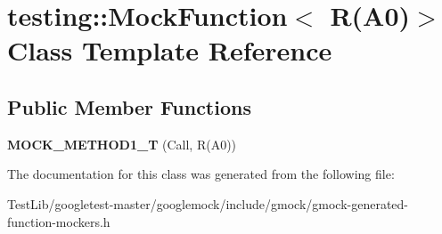 \hypertarget{classtesting_1_1MockFunction_3_01R_07A0_08_4}{}\section{testing\+:\+:Mock\+Function$<$ R(A0)$>$ Class Template Reference}
\label{classtesting_1_1MockFunction_3_01R_07A0_08_4}
\subsection*{Public Member Functions}
\begin{DoxyCompactItemize}
\item 
\mbox{\label{classtesting_1_1MockFunction_3_01R_07A0_08_4_a6a22e7e14b53d2df30bef4404b41fade}} 
{\bfseries M\+O\+C\+K\+\_\+\+M\+E\+T\+H\+O\+D1\+\_\+T} (Call, R(A0))
\end{DoxyCompactItemize}


The documentation for this class was generated from the following file\+:\begin{DoxyCompactItemize}
\item 
Test\+Lib/googletest-\/master/googlemock/include/gmock/gmock-\/generated-\/function-\/mockers.\+h\end{DoxyCompactItemize}
